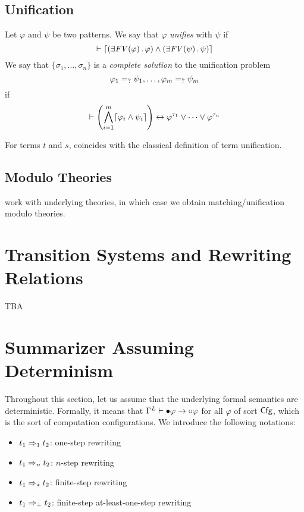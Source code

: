 \documentclass{article}
\begin{document}
\subsection{Unification}

\begin{definition}
\label{def:unification}
Let $\varphi$ and $\psi$ be two patterns. We say that $\varphi$ \emph{unifies}
with $\psi$ if
\[\vdash \lceil\left(\exists \mathit{FV(\varphi)} \,.\, \varphi\right)
  \land \left(\exists \mathit{FV(\psi)} \,.\, \psi\right)\rceil\]
We say that $\{\sigma_1,\dots,\sigma_n\}$ is a \emph{complete solution}
to the unification problem
\[\varphi_1 =_? \psi_1, \dots, \varphi_m =_? \psi_m\]
if
\[\vdash \left(\bigwedge_{i=1}^m \lceil\varphi_i \land \psi_i\rceil\right)
  \leftrightarrow \varphi^{\tau_1} \lor \dots \lor \varphi^{\tau_n}
\]
\end{definition}

\begin{proposition}
For terms $t$ and $s$,
 coincides with the classical definition of term unification.
\end{proposition}

\subsection{Modulo Theories}

 work with underlying theories, 
in which case we obtain matching/unification modulo theories.

\section{Transition Systems and Rewriting Relations}

TBA

\section{\K Summarizer Assuming Determinism}

Throughout this section, let us assume that
the underlying formal semantics are deterministic.
Formally, it means that
$\Gamma^L \vdash \mathord{\bullet} \varphi \rightarrow \mathord{\circ} \varphi$
for all $\varphi$ of sort $\mathsf{Cfg}$, which is the sort of computation configurations. 
We introduce the following notations:
\begin{itemize}\renewcommand\labelitemi{--}
\item $t_1 \Rightarrow_1 t_2$: one-step rewriting
\item $t_1 \Rightarrow_n t_2$: $n$-step rewriting
\item $t_1 \Rightarrow_* t_2$: finite-step rewriting
\item $t_1 \Rightarrow_+ t_2$: finite-step at-least-one-step rewriting
\end{itemize}
\end{document}
